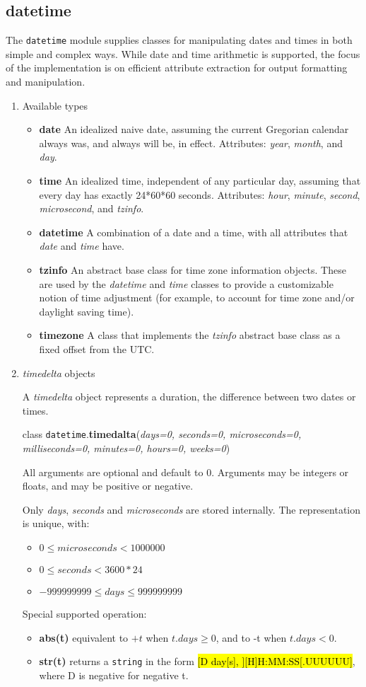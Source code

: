 \subsection{datetime}
The \texttt{datetime} module supplies classes for manipulating dates and times in both simple and complex ways. While date and time arithmetic is supported, the focus of the implementation is on efficient attribute extraction for output formatting and manipulation.
\begin{enumerate}
\item Available types
\begin{itemize}
\item \textbf{date} An idealized naive date, assuming the current Gregorian calendar always was, and always will be, in effect. Attributes: \textit{year}, \textit{month}, and \textit{day}.
\item \textbf{time} An idealized time, independent of any particular day, assuming that every day has exactly 24*60*60 seconds. Attributes: \textit{hour}, \textit{minute}, \textit{second}, \textit{microsecond}, and \textit{tzinfo}.
\item \textbf{datetime} A combination of a date and a time, with all attributes that \textit{date} and \textit{time} have.
\item \textbf{tzinfo} An abstract base class for time zone information objects. These are used by the \textit{datetime} and \textit{time} classes to provide a customizable notion of time adjustment (for example, to account for time zone and/or daylight saving time).
\item \textbf{timezone} A class that implements the \textit{tzinfo} abstract base class as a fixed offset from the UTC.
\end{itemize}

\item \textit{timedelta} objects

A \textit{timedelta} object represents a duration, the difference between two dates or times.

class \texttt{datetime}.\textbf{timedalta}(\textit{days=0, seconds=0, microseconds=0, milliseconds=0, minutes=0, hours=0, weeks=0}) 

All arguments are optional and default to 0. Arguments may be integers or floats, and may be positive or negative. 

Only \textit{days}, \textit{seconds} and \textit{microseconds} are stored internally. The representation is unique, with:
\begin{itemize}
\item $0 \leq microseconds < 1000000$
\item $0 \le seconds < 3600*24$
\item $-999999999 \le days \le 999999999$
\end{itemize}
Special supported operation:
\begin{itemize}
\item \textbf{abs(t)} equivalent to $+t$ when $t.days \ge 0$, and to -t when $t.days < 0$.
\item \textbf{str(t)} returns a \texttt{string} in the form \hl{[D day[s], ][H]H:MM:SS[.UUUUUU]}, where D is negative for negative t. 
\end{itemize}


\end{enumerate}
